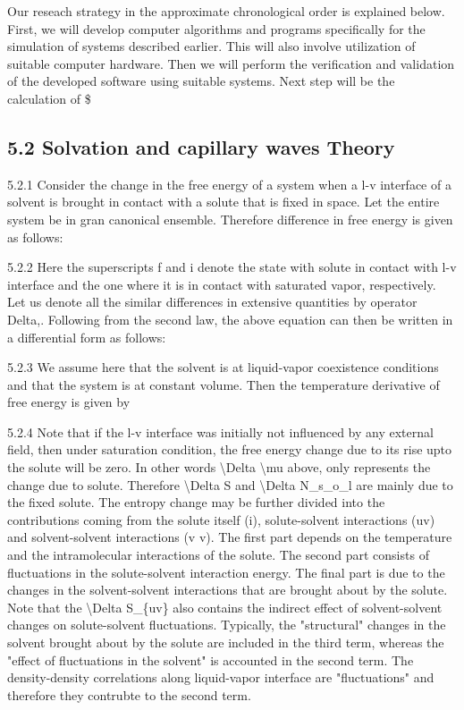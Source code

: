 \par Our reseach strategy in the approximate chronological order is explained below. First, we will develop computer algorithms and programs specifically for the simulation of systems described earlier. This will also involve utilization of suitable computer hardware. Then we will perform the verification and validation of the developed software using suitable systems. Next step will be the calculation of  \$\subsection{5.2 Solvation and capillary waves Theory}

\par 5.2.1 Consider the change in the free energy of a system when a l-v interface of a solvent is brought in contact with a solute that is fixed in space. Let the entire system be in gran canonical ensemble. Therefore difference in free energy is given as follows:
\par 5.2.2 Here the superscripts f and i denote the state with solute in contact with l-v interface and the one where it is in contact with saturated vapor, respectively. Let us denote all the similar differences in extensive quantities by operator Delta,. Following from the second law, the above equation can then be written in a differential form as follows:
\par 5.2.3 We assume here that the solvent is at liquid-vapor coexistence conditions and that the system is at constant volume. Then the temperature derivative of free energy is given by
\par 5.2.4 Note that if the l-v interface was initially not influenced by any external field, then under saturation condition, the free energy change due to its rise upto the solute will be zero. In other words \textbackslash Delta \textbackslash mu above, only represents the change due to solute. Therefore \textbackslash Delta S and \textbackslash Delta N\_s\_o\_l are mainly due to the fixed solute. The entropy change may be further divided into the contributions coming from the solute itself (i), solute-solvent interactions (uv) and solvent-solvent interactions (v v). The first part depends on the temperature and the intramolecular interactions of the solute. The second part consists of fluctuations in the solute-solvent interaction energy. The final part is due to the changes in the solvent-solvent interactions that are brought about by the solute. Note that the \textbackslash Delta S\_\{uv\} also contains the indirect effect of solvent-solvent changes on solute-solvent fluctuations. Typically, the "structural" changes in the solvent brought about by the solute are included in the third term, whereas the "effect of fluctuations in the solvent" is accounted in the second term. The density-density correlations along liquid-vapor interface are "fluctuations" and therefore they contrubte to the second term.
